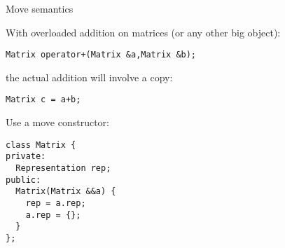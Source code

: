  {Move semantics}

With overloaded addition on matrices (or any other big object):
\begin{lstlisting}
Matrix operator+(Matrix &a,Matrix &b);
\end{lstlisting}
the actual addition will involve a copy:
\begin{lstlisting}
Matrix c = a+b;
\end{lstlisting}

Use a move constructor:
\begin{lstlisting}
class Matrix {
private:
  Representation rep;
public:
  Matrix(Matrix &&a) {
    rep = a.rep;
    a.rep = {};
  }
};
\end{lstlisting}


